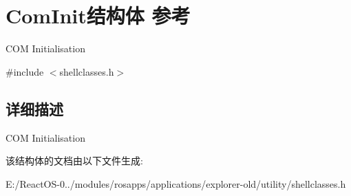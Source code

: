 \hypertarget{struct_com_init}{}\section{Com\+Init结构体 参考}
\label{struct_com_init}


C\+OM Initialisation  




{\ttfamily \#include $<$shellclasses.\+h$>$}



\subsection{详细描述}
C\+OM Initialisation 

该结构体的文档由以下文件生成\+:\begin{DoxyCompactItemize}
\item 
E\+:/\+React\+O\+S-\/0../modules/rosapps/applications/explorer-\/old/utility/shellclasses.\+h\end{DoxyCompactItemize}
